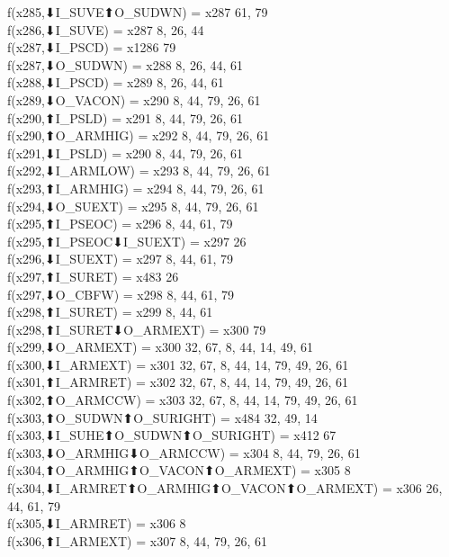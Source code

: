 f(x285,⬇I_SUVE⬆O_SUDWN) = x287 {61, 79} \\
f(x286,⬇I_SUVE) = x287 {8, 26, 44} \\
f(x287,⬇I_PSCD) = x1286 {79} \\
f(x287,⬇O_SUDWN) = x288 {8, 26, 44, 61} \\
f(x288,⬇I_PSCD) = x289 {8, 26, 44, 61} \\
f(x289,⬇O_VACON) = x290 {8, 44, 79, 26, 61} \\
f(x290,⬆I_PSLD) = x291 {8, 44, 79, 26, 61} \\
f(x290,⬆O_ARMHIG) = x292 {8, 44, 79, 26, 61} \\
f(x291,⬇I_PSLD) = x290 {8, 44, 79, 26, 61} \\
f(x292,⬇I_ARMLOW) = x293 {8, 44, 79, 26, 61} \\
f(x293,⬆I_ARMHIG) = x294 {8, 44, 79, 26, 61} \\
f(x294,⬇O_SUEXT) = x295 {8, 44, 79, 26, 61} \\
f(x295,⬆I_PSEOC) = x296 {8, 44, 61, 79} \\
f(x295,⬆I_PSEOC⬇I_SUEXT) = x297 {26} \\
f(x296,⬇I_SUEXT) = x297 {8, 44, 61, 79} \\
f(x297,⬆I_SURET) = x483 {26} \\
f(x297,⬇O_CBFW) = x298 {8, 44, 61, 79} \\
f(x298,⬆I_SURET) = x299 {8, 44, 61} \\
f(x298,⬆I_SURET⬇O_ARMEXT) = x300 {79} \\
f(x299,⬇O_ARMEXT) = x300 {32, 67, 8, 44, 14, 49, 61} \\
f(x300,⬇I_ARMEXT) = x301 {32, 67, 8, 44, 14, 79, 49, 26, 61} \\
f(x301,⬆I_ARMRET) = x302 {32, 67, 8, 44, 14, 79, 49, 26, 61} \\
f(x302,⬆O_ARMCCW) = x303 {32, 67, 8, 44, 14, 79, 49, 26, 61} \\
f(x303,⬆O_SUDWN⬆O_SURIGHT) = x484 {32, 49, 14} \\
f(x303,⬇I_SUHE⬆O_SUDWN⬆O_SURIGHT) = x412 {67} \\
f(x303,⬇O_ARMHIG⬇O_ARMCCW) = x304 {8, 44, 79, 26, 61} \\
f(x304,⬆O_ARMHIG⬆O_VACON⬆O_ARMEXT) = x305 {8} \\
f(x304,⬇I_ARMRET⬆O_ARMHIG⬆O_VACON⬆O_ARMEXT) = x306 {26, 44, 61, 79} \\
f(x305,⬇I_ARMRET) = x306 {8} \\
f(x306,⬆I_ARMEXT) = x307 {8, 44, 79, 26, 61} \\
